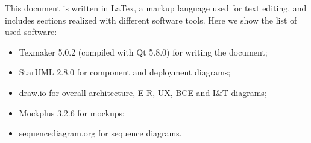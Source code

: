 This document is written in LaTex, a markup language used for text editing, and includes sections realized with different software tools. Here we show the list of used software:
\begin{itemize}
	\item Texmaker 5.0.2 (compiled with Qt 5.8.0) for writing the document;
	\item StarUML 2.8.0 for component and deployment diagrams;
	\item draw.io for overall architecture, E-R, UX, BCE and I\&T diagrams;
	\item Mockplus 3.2.6 for mockups;
	\item sequencediagram.org for sequence diagrams.
\end{itemize}